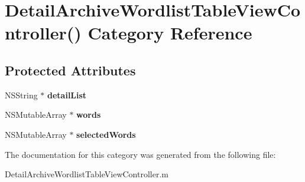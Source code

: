\hypertarget{category_detail_archive_wordlist_table_view_controller_07_08}{\section{Detail\+Archive\+Wordlist\+Table\+View\+Controller() Category Reference}
\label{category_detail_archive_wordlist_table_view_controller_07_08}
}
\subsection*{Protected Attributes}
\begin{DoxyCompactItemize}
\item 
\hypertarget{category_detail_archive_wordlist_table_view_controller_07_08_a1dd7e475e7bee16a715088a824303d17}{N\+S\+String $\ast$ {\bfseries detail\+List}}\label{category_detail_archive_wordlist_table_view_controller_07_08_a1dd7e475e7bee16a715088a824303d17}

\item 
\hypertarget{category_detail_archive_wordlist_table_view_controller_07_08_a2bee397e777f87efb31bce98038dabfc}{N\+S\+Mutable\+Array $\ast$ {\bfseries words}}\label{category_detail_archive_wordlist_table_view_controller_07_08_a2bee397e777f87efb31bce98038dabfc}

\item 
\hypertarget{category_detail_archive_wordlist_table_view_controller_07_08_a14e3763c452803de2cd8699f5bf56f4b}{N\+S\+Mutable\+Array $\ast$ {\bfseries selected\+Words}}\label{category_detail_archive_wordlist_table_view_controller_07_08_a14e3763c452803de2cd8699f5bf56f4b}

\end{DoxyCompactItemize}


The documentation for this category was generated from the following file\+:\begin{DoxyCompactItemize}
\item 
Detail\+Archive\+Wordlist\+Table\+View\+Controller.\+m\end{DoxyCompactItemize}

